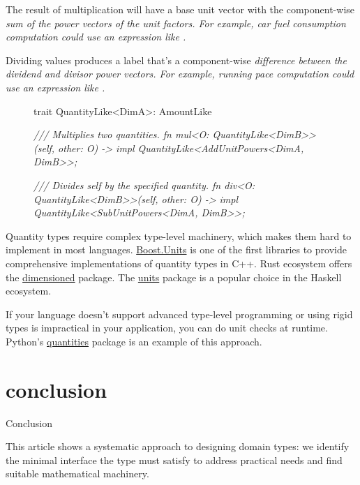 \documentclass{article}
\begin{document}
The result of multiplication will have a base unit vector with the component-wise \em{sum} of the power vectors of the unit factors.
For example, car fuel consumption computation could use an expression like .

Dividing values produces a label that's a component-wise \em{difference} between the dividend and divisor power vectors.
For example, running pace computation could use an expression like .

\begin{figure}
\begin{code}
trait QuantityLike<DimA>: AmountLike {
  \em{/// Multiplies two quantities.}
  fn mul<O: QuantityLike<DimB>>(self, other: O)
    -> impl QuantityLike<AddUnitPowers<DimA, DimB>>;

  \em{/// Divides self by the specified quantity.}
  fn div<O: QuantityLike<DimB>>(self, other: O)
    -> impl QuantityLike<SubUnitPowers<DimA, DimB>>;
}
\end{code}
\end{figure}

Quantity types require complex type-level machinery, which makes them hard to implement in most languages.
\href{https://www.boost.org/doc/libs/1_65_0/doc/html/boost_units.html}{Boost.Units} is one of the first libraries to provide comprehensive implementations of quantity types in C++.
Rust ecosystem offers the \href{https://crates.io/crates/dimensioned}{dimensioned} package.
The \href{https://hackage.haskell.org/package/units}{units} package is a popular choice in the Haskell ecosystem.

If your language doesn't support advanced type-level programming or using rigid types is impractical in your application, you can do unit checks at runtime.
Python's \href{https://github.com/python-quantities/python-quantities}{quantities} package is an example of this approach.

\section{conclusion}{Conclusion}

This article shows a systematic approach to designing domain types: we identify the minimal interface the type must satisfy to address practical needs and find suitable mathematical machinery.
\end{document}
